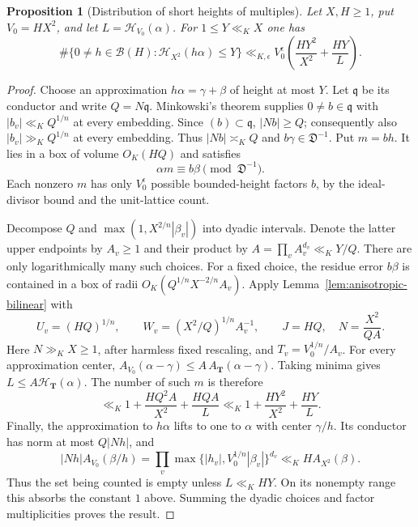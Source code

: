 \documentclass[11pt]{amsart}
\newtheorem{proposition}[theorem]{Proposition}
\theoremstyle{definition}
\numberwithin{equation}{section}
\begin{document}
\begin{proposition}[Distribution of short heights of multiples]
\label{prop:short-height-multiples}
Let $X,H\ge1$, put $V_0=HX^2$, and let
$L=\mathcal H_{V_0}(\alpha)$. For $1\le Y\ll_K X$ one has
\[
 \#\{0\ne h\in\mathcal B(H):\mathcal H_{X^2}(h\alpha)\le Y\}
 \ll_{K,\epsilon} V_0^\epsilon
       \left(\frac{HY^2}{X^2}+\frac{HY}{L}\right).
\]
\end{proposition}
\begin{proof}
Choose an approximation $h\alpha=\gamma+\beta$ of height at most $Y$.
Let $\mathfrak q$ be its conductor and write $Q=N\mathfrak q$.
Minkowski's theorem supplies $0\ne b\in\mathfrak q$ with
$|b_v|\ll_KQ^{1/n}$ at every embedding. Since $(b)\subset\mathfrak q$,
$|Nb|\ge Q$; consequently also $|b_v|\gg_KQ^{1/n}$ at every embedding.
Thus $|Nb|\asymp_K Q$ and $b\gamma\in\mathfrak D^{-1}$.
Put $m=bh$. It lies in a box of volume $O_K(HQ)$ and satisfies
\[
 \alpha m\equiv b\beta\pmod{\mathfrak D^{-1}}.
\]
Each nonzero $m$ has only $V_0^\epsilon$ possible bounded-height factors
$b$, by the ideal-divisor bound and the unit-lattice count.

Decompose $Q$ and
$\max(1,X^{2/n}|\beta_v|)$ into dyadic intervals. Denote the latter
upper endpoints by $A_v\ge1$ and their product by
$A=\prod_v A_v^{d_v}\ll_KY/Q$.
There are only logarithmically many such choices. For a fixed choice,
the residue error $b\beta$ is contained in a box of radii
$O_K(Q^{1/n}X^{-2/n}A_v)$. Apply
Lemma~\ref{lem:anisotropic-bilinear} with
\[
 U_v=(HQ)^{1/n},\qquad
 W_v=(X^2/Q)^{1/n}A_v^{-1},\qquad
 J=HQ,\quad N=\frac{X^2}{QA}.
\]
Here $N\gg_KX\ge1$, after harmless fixed rescaling, and
$T_v=V_0^{1/n}/A_v$.
For every approximation center,
$A_{V_0}(\alpha-\gamma)\le A\,A_{\mathbf T}(\alpha-\gamma)$.
Taking minima gives $L\le A\mathcal H_{\mathbf T}(\alpha)$.
The number of such $m$ is therefore
\[
 \ll_K1+\frac{HQ^2A}{X^2}+\frac{HQA}{L}
 \ll_K1+\frac{HY^2}{X^2}+\frac{HY}{L}.
\]
Finally, the approximation to $h\alpha$ lifts to one to $\alpha$
with center $\gamma/h$. Its conductor has norm at most $Q|Nh|$, and
\[
 |Nh|A_{V_0}(\beta/h)
   =\prod_v\max\{|h_v|,V_0^{1/n}|\beta_v|\}^{d_v}
   \ll_K H A_{X^2}(\beta).
\]
Thus the set being counted is empty unless $L\ll_K HY$.
On its nonempty range this absorbs the constant $1$ above.
Summing the dyadic choices and factor multiplicities proves the result.
\end{proof}
\end{document}

